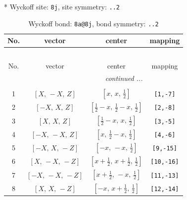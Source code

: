 \documentclass[fleqn,8pt]{jsarticle}
\begin{document}
* Wyckoff site: {\tt 8j}, site symmetry: {\tt ..2}
\renewcommand{\arraystretch}{1.2}
\begin{longtable}{cccc}
\caption{Wyckoff bond: {\tt 8a@8j}, bond symmetry: {\tt ..2}}
 \\
 \hline \hline
No. & vector & center & mapping \\ \hline \endfirsthead

\multicolumn{3}{l}{\tablename\ \thetable{}} \\
 \hline \hline
No. & vector & center & mapping \\ \hline \endhead

 \hline \hline
\multicolumn{3}{r}{\footnotesize\it continued ...} \\ \endfoot

 \hline \hline
\multicolumn{3}{r}{} \\ \endlastfoot

1 & $\left[ X,\, - X,\, Z \right]$ & $\left[ x,\, x,\, \frac{1}{2} \right]$ & {\tt [1,-7]} \\ \hline
2 & $\left[ - X,\, X,\, Z \right]$ & $\left[ \frac{1}{2} - x,\, \frac{1}{2} - x,\, \frac{1}{2} \right]$ & {\tt [2,-8]} \\ \hline
3 & $\left[ X,\, X,\, Z \right]$ & $\left[ \frac{1}{2} - x,\, x,\, \frac{1}{2} \right]$ & {\tt [3,-5]} \\ \hline
4 & $\left[ - X,\, - X,\, Z \right]$ & $\left[ x,\, \frac{1}{2} - x,\, \frac{1}{2} \right]$ & {\tt [4,-6]} \\ \hline
5 & $\left[ - X,\, X,\, - Z \right]$ & $\left[ - x,\, - x,\, \frac{1}{2} \right]$ & {\tt [9,-15]} \\ \hline
6 & $\left[ X,\, - X,\, - Z \right]$ & $\left[ x + \frac{1}{2},\, x + \frac{1}{2},\, \frac{1}{2} \right]$ & {\tt [10,-16]} \\ \hline
7 & $\left[ - X,\, - X,\, - Z \right]$ & $\left[ x + \frac{1}{2},\, - x,\, \frac{1}{2} \right]$ & {\tt [11,-13]} \\ \hline
8 & $\left[ X,\, X,\, - Z \right]$ & $\left[ - x,\, x + \frac{1}{2},\, \frac{1}{2} \right]$ & {\tt [12,-14]} \\
\end{longtable}
\renewcommand{\arraystretch}{1.2}
\end{document}
